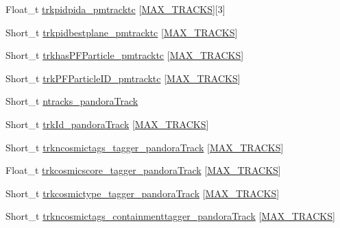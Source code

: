 \begin{DoxyCompactItemize}
\item 
Float\-\_\-t \hyperlink{classanatree_a78722ecfd18c56bd7524a2ec60f6eb47}{trkpidpida\-\_\-pmtracktc} \mbox{[}\hyperlink{anatree__core__v09410002_8h_a327fd4e796e4a0d78947524c96e4362e}{M\-A\-X\-\_\-\-T\-R\-A\-C\-K\-S}\mbox{]}\mbox{[}3\mbox{]}
\item 
Short\-\_\-t \hyperlink{classanatree_a051594048bebe4a09379ad3c7139d3e3}{trkpidbestplane\-\_\-pmtracktc} \mbox{[}\hyperlink{anatree__core__v09410002_8h_a327fd4e796e4a0d78947524c96e4362e}{M\-A\-X\-\_\-\-T\-R\-A\-C\-K\-S}\mbox{]}
\item 
Short\-\_\-t \hyperlink{classanatree_ae21229d376f21bb02c0b556a95cc18ff}{trkhas\-P\-F\-Particle\-\_\-pmtracktc} \mbox{[}\hyperlink{anatree__core__v09410002_8h_a327fd4e796e4a0d78947524c96e4362e}{M\-A\-X\-\_\-\-T\-R\-A\-C\-K\-S}\mbox{]}
\item 
Short\-\_\-t \hyperlink{classanatree_a6e39a1207f4a1969df07ca79552f55bf}{trk\-P\-F\-Particle\-I\-D\-\_\-pmtracktc} \mbox{[}\hyperlink{anatree__core__v09410002_8h_a327fd4e796e4a0d78947524c96e4362e}{M\-A\-X\-\_\-\-T\-R\-A\-C\-K\-S}\mbox{]}
\item 
Short\-\_\-t \hyperlink{classanatree_aba7a2fc1d504be3fd87f32245ccd56c5}{ntracks\-\_\-pandora\-Track}
\item 
Short\-\_\-t \hyperlink{classanatree_acc16f3ca1721c1b25f12d3d6aa418665}{trk\-Id\-\_\-pandora\-Track} \mbox{[}\hyperlink{anatree__core__v09410002_8h_a327fd4e796e4a0d78947524c96e4362e}{M\-A\-X\-\_\-\-T\-R\-A\-C\-K\-S}\mbox{]}
\item 
Short\-\_\-t \hyperlink{classanatree_a8502a80cca87ae93dcbc0619b539ed24}{trkncosmictags\-\_\-tagger\-\_\-pandora\-Track} \mbox{[}\hyperlink{anatree__core__v09410002_8h_a327fd4e796e4a0d78947524c96e4362e}{M\-A\-X\-\_\-\-T\-R\-A\-C\-K\-S}\mbox{]}
\item 
Float\-\_\-t \hyperlink{classanatree_a68274dba0d5fdd18e04edb86e84b918f}{trkcosmicscore\-\_\-tagger\-\_\-pandora\-Track} \mbox{[}\hyperlink{anatree__core__v09410002_8h_a327fd4e796e4a0d78947524c96e4362e}{M\-A\-X\-\_\-\-T\-R\-A\-C\-K\-S}\mbox{]}
\item 
Short\-\_\-t \hyperlink{classanatree_aeb0bcbc98bb154bc0ab3869b3b2f64f5}{trkcosmictype\-\_\-tagger\-\_\-pandora\-Track} \mbox{[}\hyperlink{anatree__core__v09410002_8h_a327fd4e796e4a0d78947524c96e4362e}{M\-A\-X\-\_\-\-T\-R\-A\-C\-K\-S}\mbox{]}
\item 
Short\-\_\-t \hyperlink{classanatree_abd7bb94b6c4a5d6661d5d5b935b39306}{trkncosmictags\-\_\-containmenttagger\-\_\-pandora\-Track} \mbox{[}\hyperlink{anatree__core__v09410002_8h_a327fd4e796e4a0d78947524c96e4362e}{M\-A\-X\-\_\-\-T\-R\-A\-C\-K\-S}\mbox{]}

\end{DoxyCompactItemize}

